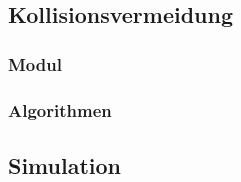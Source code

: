\subsection{Kollisionsvermeidung}
\label{kollisionsvermeidung_subsec}

\subsubsection{Modul}
\authorsection{\editortobias}

\subsubsection{Algorithmen}
\authorsection{\editorjulian}


\subsection{Simulation}
\label{simulation_subsec}
\authorsection{\editoroier}
